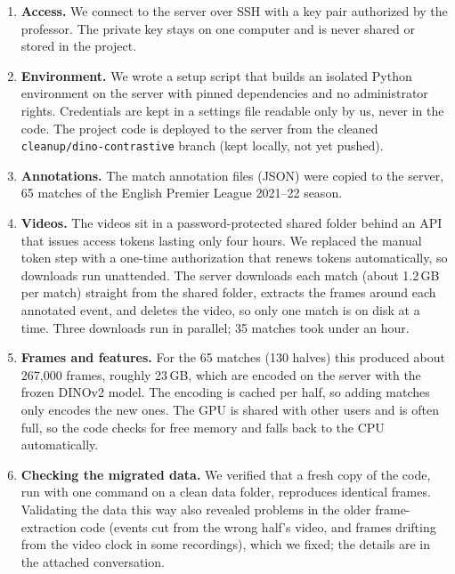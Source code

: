 \documentclass[11pt]{article}
\begin{document}
\begin{enumerate}[noitemsep]
  \item \textbf{Access.} We connect to the server over SSH with a key pair authorized by the professor.
        The private key stays on one computer and is never shared or stored in the project.
  \item \textbf{Environment.} We wrote a setup script that builds an isolated Python environment on the
        server with pinned dependencies and no administrator rights. Credentials are kept in a settings file
        readable only by us, never in the code. The project code is deployed to the server from the
        cleaned \texttt{cleanup/dino-contrastive} branch (kept locally, not yet pushed).
  \item \textbf{Annotations.} The match annotation files (JSON) were copied to the server, 65 matches of
        the English Premier League 2021--22 season.
  \item \textbf{Videos.} The videos sit in a password-protected shared folder behind an API that issues
        access tokens lasting only four hours. We replaced the manual token step with a one-time
        authorization that renews tokens automatically, so downloads run unattended. The server downloads each
        match (about 1.2\,GB per match) straight from the shared folder, extracts the frames around each
        annotated event, and deletes the video, so only one match is on disk at a time. Three downloads run in
        parallel; 35 matches took under an hour.
  \item \textbf{Frames and features.} For the 65 matches (130 halves) this produced about 267{,}000 frames,
        roughly 23\,GB, which are encoded on the server with the frozen DINOv2 model. The encoding is cached
        per half, so adding matches only encodes the new ones. The GPU is shared with other users and is often
        full, so the code checks for free memory and falls back to the CPU automatically.
  \item \textbf{Checking the migrated data.} We verified that a fresh copy of the code, run with one command
        on a clean data folder, reproduces identical frames. Validating the data this way also revealed
        problems in the older frame-extraction code (events cut from the wrong half's video, and frames
        drifting from the video clock in some recordings), which we fixed; the details are in the attached
        conversation.
\end{enumerate}
\end{document}
